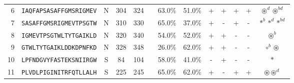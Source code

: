 \begin{tabular}{rcccccccccccc}
6  &  \texttt{IAQFAPSASAFFGMSRIGMEV} &       N &    304 &   324 &                                                                  &                          63.0\% &                           51.0\% &          + &           + &          + &           + &                                                                                                                          $ \circledast^d \circledast^{bd} $ \\
7  &  \texttt{SASAFFGMSRIGMEVTPSGTW} &       N &    310 &   330 &                                                                  &                          65.0\% &                           37.0\% &          + &           - &          + &           - &                                                                                                                                 $ \ast^b \ast^d \ast^{bd} $ \\
8  &  \texttt{IGMEVTPSGTWLTYTGAIKLD} &       N &    320 &   340 &                                                                  &                          54.0\% &                           52.0\% &          + &           + &          - &           - &                                                                                                                                           $ \circledast^b $ \\
9  &  \texttt{GTWLTYTGAIKLDDKDPNFKD} &       N &    328 &   348 &                                                                  &                          26.0\% &                           62.0\% &          + &           + &          - &           - &                                                                                                                                     $ \circ^b \circledast $ \\
10 &  \texttt{LPFNDGVYFASTEKSNIIRGW} &       S &     84 &   104 &                                                                  &                          58.0\% &                           41.0\% &          - &           + &          - &           - &                                                                                                                                                    $ \ast $ \\
11 &  \texttt{PLVDLPIGINITRFQTLLALH} &       S &    225 &   245 &                                                                  &                          65.0\% &                           62.0\% &          + &           - &          + &           + &                                                                                                                               $ \circledast \circledast^d $ \\

\end{tabular}
